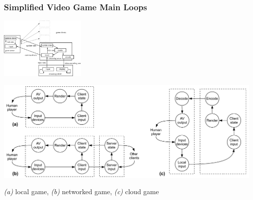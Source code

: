 \documentclass{UDEbeamerEN}
\begin{document}
\begin{frame}
	\frametitle{Simplified Video Game Main Loops}

	\begin{center}
		\includegraphics[height=3cm]{../../../models/game-tick-rate-streamed.pdf}

		\includegraphics[width=1.0\textwidth]{../../../models/component_interaction_full.pdf}

		 \textit{(a)} local game, \textit{(b)} networked game, \textit{(c)} cloud game
	\end{center}

\end{frame}
\end{document}
